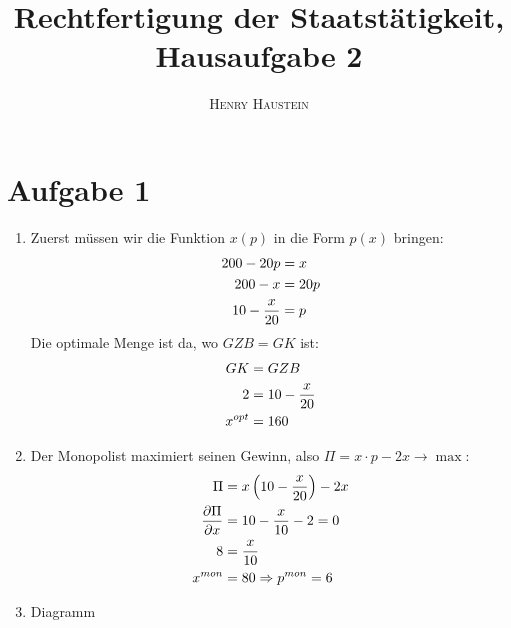 \documentclass{article}
\title{\textbf{Rechtfertigung der Staatstätigkeit, Hausaufgabe 2}}
\author{\textsc{Henry Haustein}}
\date{}
\begin{document}
	\maketitle
	
	\section*{Aufgabe 1}
	\begin{enumerate}[label=(\alph*)]
		\item Zuerst müssen wir die Funktion $x(p)$ in die Form $p(x)$ bringen: 
		\begin{align}
			200-20p &= x \notag \\
			200-x &= 20p \notag \\
			10-\frac{x}{20} &= p \notag
		\end{align}
		Die optimale Menge ist da, wo $GZB=GK$ ist:
		\begin{align}
			GK &= GZB \notag \\
			2 &= 10-\frac{x}{20} \notag \\
			x^{opt} &= 160 \notag
		\end{align}
		\item Der Monopolist maximiert seinen Gewinn, also $\Pi = x\cdot p-2x\to\max$:
		\begin{align}
			\Pi &= x\left(10-\frac{x}{20}\right)-2x \notag \\
			\frac{\partial \Pi}{\partial x} &= 10-\frac{x}{10}-2 = 0 \notag \\
			8 &= \frac{x}{10} \notag \\
			x^{mon} &= 80 \Rightarrow p^{mon}=6 \notag
		\end{align}
		\item Diagramm
		\begin{center}
\end{center}
\end{enumerate}
\end{document}
